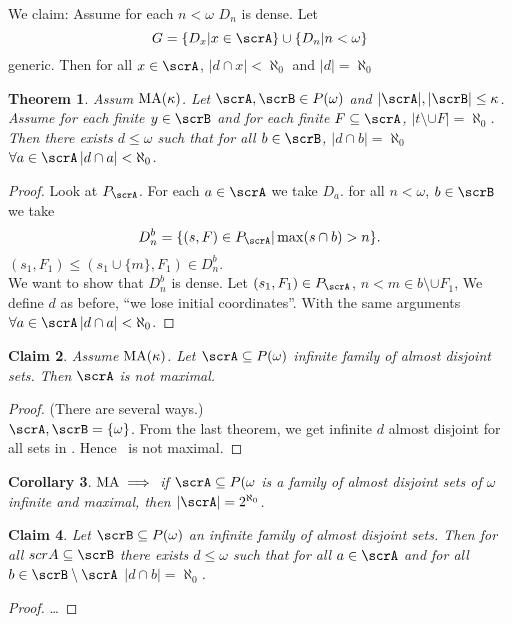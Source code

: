 \documentclass[11pt,pdftex,twoside,a4paper]{article}
\newcommand{\MA}{\ensuremath{\mathop{\rm MA}\nolimits}}
\newtheorem{thm}{Theorem}[section]
\newtheorem{claim}[thm]{Claim}
\newtheorem{corollary}[thm]{Corollary}
\theoremstyle{definition}
\begin{document}
We claim: Assume for each \(n<\omega\) \(D_n\) is dense.
Let
\begin{equation*}
G = \{D_x| x\in\scrA\} \cup \{D_n | n < \omega\}
\end{equation*}
generic.
Then for all \(x\in\scrA\), \(|d\cap x|< \aleph_0\) and \(|d|=\aleph_0\)

\begin{thm}
Assum \(\MA(\kappa)\). Let \(\scrA,\scrB\in P(\omega)\) and 
\(|\scrA|,|\scrB| \leq \kappa\).
Assume for each finite \(y\in\scrB\) and for each finite \(F\subseteq \scrA\),
\(|t\setminus \cup F|=\aleph_0\).
Then there exists \(d\leq \omega\) such that for all \(b\in\scrB\),
\(|d\cap b|=\aleph_0\) 
\(\forall a\in\scrA\, |d\cap a|<\aleph_0\).
\end{thm}
\begin{proof}
Look at \(P_\scrA\). For each \(a\in\scrA\) we take \(D_a\).
for all \(n<\omega\), \(b\in\scrB\) we take
\begin{equation*}
D_n^b = \{(s,F)\in P_\scrA | \max(s\cap b) > n\}.
\end{equation*}
\((s_1,F_1)\leq(s_1\cup\{m\},F_1) \in D_n^b\).
\\
We want to show that \(D_n^b\) is dense.
Let \((s_1,F_1)\in P_\scrA\), \(n < m\in b \setminus \cup F_1\),
We define $d$ as before, ``we lose initial coordinates''.
With the same arguments \(\forall a\in\scrA\, |d\cap a|<\aleph_0\).
\end{proof}

\begin{claim}
Assume \(\MA(\kappa)\). Let \(\scrA \subseteq P(\omega)\)
infinite family of almost disjoint sets. Then \(\scrA\) is not maximal.
\end{claim}
\begin{proof}
(There are several ways.)\\
\(\scrA,\scrB=\{\omega\}\).
From the last theorem, we get infinite $d$ almost disjoint 
for all sets in \scrA. Hence \scrA\ is not maximal.
\end{proof}

\begin{corollary}
\(\MA \implies\) if \(\scrA \subseteq P(\omega\) is a family
of almost disjoint sets of \(\omega\) infinite and maximal, then
\(|\scrA| = 2^{\aleph_0}\).
\end{corollary}

\begin{claim}
Let \(\scrB \subseteq P(\omega)\) an infinite family of 
almost disjoint sets. Then for all \(scrA \subseteq \scrB\)
there exists \(d \leq \omega\) such that for all \(a\in\scrA\)
and for all \(b\in \scrB\setminus\scrA\) \(|d\cap b|=\aleph_0\).
\end{claim}
\begin{proof}
\ldots
\end{proof}
\end{document}
